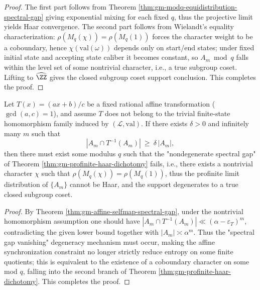 \begin{proof}
The first part follows from Theorem \ref{thm:gm-modq-equidistribution-spectral-gap} giving exponential mixing for each fixed \(q\), thus the projective limit yields Haar convergence.
The second part follows from Wielandt's equality characterization: \(\rho(M_q(\chi))=\rho(M_q(1))\) forces the character weight to be a coboundary, hence \(\chi(\mathrm{val}(\omega))\) depends only on start/end states; under fixed initial state and accepting state caliber it becomes constant, so \(A_m\bmod q\) falls within the level set of some nontrivial character, i.e., a true subgroup coset. Lifting to \(\widehat{\ZZ}\) gives the closed subgroup coset support conclusion. This completes the proof.
\end{proof}

\begin{proposition}\label{prop:gm-affine-near-closure-profinite-degeneracy}
Let \(T(x)=(ax+b)/c\) be a fixed rational affine transformation (\(\gcd(a,c)=1\)), and assume \(T\) does not belong to the trivial finite-state homomorphism family induced by \((\mathcal{L},\mathrm{val})\).
If there exists \(\delta>0\) and infinitely many \(m\) such that
\[
|A_m\cap T^{-1}(A_m)|\ \ge\ \delta\,|A_m|,
\]
then there must exist some modulus \(q\) such that the "nondegenerate spectral gap" of Theorem \ref{thm:gm-profinite-haar-dichotomy} fails, i.e., there exists a nontrivial character \(\chi\) such that \(\rho(M_q(\chi))=\rho(M_q(1))\), thus the profinite limit distribution of \(\{A_m\}\) cannot be Haar, and the support degenerates to a true closed subgroup coset.
\end{proposition}

\begin{proof}
By Theorem \ref{thm:gm-affine-selfmap-spectral-gap}, under the nontrivial homomorphism assumption one should have \(|A_m\cap T^{-1}(A_m)|\ll(\alpha-\varepsilon_T)^m\), contradicting the given lower bound together with \(|A_m|\asymp \alpha^m\).
Thus the "spectral gap vanishing" degeneracy mechanism must occur, making the affine synchronization constraint no longer strictly reduce entropy on some finite quotients; this is equivalent to the existence of a coboundary character on some mod \(q\), falling into the second branch of Theorem \ref{thm:gm-profinite-haar-dichotomy}. This completes the proof.
\end{proof}

